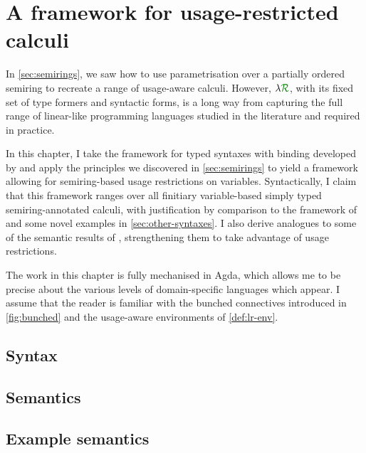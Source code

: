 \chapter{A framework for usage-restricted calculi}\label{sec:framework}

In \cref{sec:semirings}, we saw how to use parametrisation over a partially
ordered semiring to recreate a range of usage-aware calculi.
However, $\name$, with its fixed set of type formers and syntactic forms, is a
long way from capturing the full range of linear-like programming languages
studied in the literature and required in practice.

In this chapter, I take the framework for typed syntaxes with binding developed
by \citet{AACMM21} and apply the principles we discovered in
\cref{sec:semirings} to yield a framework allowing for semiring-based usage
restrictions on variables.
Syntactically, I claim that this framework ranges over all finitiary
variable-based simply typed semiring-annotated calculi, with justification by
comparison to the framework of \citet{AACMM21} and some novel examples in
\cref{sec:other-syntaxes}.
I also derive analogues to some of the semantic results of \citet{AACMM21},
strengthening them to take advantage of usage restrictions.

The work in this chapter is fully mechanised in Agda, which allows me to be
precise about the various levels of domain-specific languages which appear.
I assume that the reader is familiar with the bunched connectives introduced in
\cref{fig:bunched} and the usage-aware environments of \cref{def:lr-env}.

\section{Syntax}



\section{Semantics}



\section{Example semantics}\label{sec:example-semantics}


